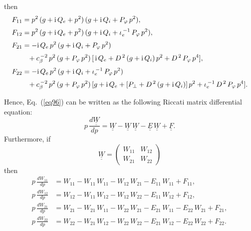 \documentclass[12pt,prb,aps,notitlepage]{revtex4-1}
\begin{document}
then
\begin{align}\label{f1}
F_{11} &= p^2\,(g+{\rm i}\,Q_e+p^2)\,(g+{\rm i}\,Q_i + P_\varphi\,p^2),\\[0.5ex]
F_{12} &= p^2\,(g+{\rm i}\,Q_e+p^2)\,(g+{\rm i}\,Q_i + \iota_e^{\,-1}\,P_\varphi\,p^2),\\[0.5ex]
F_{21} &=-{\rm i}\,Q_e\,p^2\,(g+{\rm i}\,Q_i+P_\varphi\,p^2)\nonumber\\[0.5ex]
&\phantom{=} + c_\beta^{\,-2}\,p^2\,(g+P_\varphi\,p^2)\,[\,{\rm i}\,Q_e+ D^{\,2}\,(g+{\rm i}\,Q_i)\,p^2 + D^{\,2}\,P_\varphi\,p^4],\\[0.5ex]
F_{22} &=-{\rm i}\,Q_e\,p^2\,(g+{\rm i}\,Q_i+\iota_e^{\,-1}\,P_\varphi\,p^2)\nonumber\\[0.5ex] 
&\phantom{=}+c_\beta^{\,-2}\,p^2\,(g+P_\varphi\,p^2)\,[g+{\rm i}\,Q_e + [P_\perp +D^{\,2}\,(g + {\rm i}\,Q_i)]\,p^2 + \iota_e^{\,-1}\,D^{\,2}\,P_\varphi\,p^4].\label{f4}
\end{align}

Hence, Eq.~(\ref{eq96}) can be written as the  following Riccati matrix differential equation:  
\begin{equation}\label{ricc}
p\,\frac{d\underline{\underline{W}}}{dp} = \underline{\underline{W}} - \underline{\underline{W}}\,\underline{\underline{W}} - \underline{\underline{E}}\,\underline{\underline{W}}
+\underline{\underline{F}}.
\end{equation}
Furthermore, if 
\begin{equation}
\underline{\underline{W}}= \left(\begin{array}{cc} W_{11}&W_{12}\\W_{21}&W_{22}\end{array}\right)
\end{equation}
then
\begin{align}
p\,\frac{dW_{11}}{dp}  &= W_{11}  - W_{11}\,W_{11}-W_{12}\,W_{21}- E_{11}\,W_{11} + F_{11},\\[0.5ex]
p\,\frac{dW_{12}}{dp} &= W_{12} - W_{11}\,W_{12} - W_{12}\,W_{22} - E_{11}\,W_{12} + F_{12},\\[0.5ex]
p\,\frac{dW_{21}}{dp} &= W_{21} -W_{21}\,W_{11}- W_{22}\,W_{21} - E_{21}\,W_{11} - E_{22}\,W_{21} + F_{21},\\[0.5ex]
p\,\frac{dW_{22}}{dp} &= W_{22} -W_{21}\,W_{12}- W_{22}\,W_{22}- E_{21}\,W_{12} - E_{22}\,W_{22} + F_{22}.
\end{align}
\end{document}
